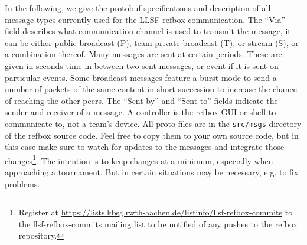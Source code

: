 \documentclass[a4paper]{article}
\begin{document}
In the following, we give the protobuf specifications and description
of all message types currently used for the LLSF refbox
communication. The ``Via'' field describes what communication channel
is used to transmit the message, it can be either public broadcast
(P), team-private broadcast (T), or stream (S), or a combination
thereof. Many messages are sent at certain periods. These are given in
seconds time in between two sent messages, or event if it is sent on
particular events. Some broadcast messages feature a burst mode to
send a number of packets of the same content in short succession to
increase the chance of reaching the other peers. The ``Sent by'' and
``Sent to'' fields indicate the sender and receiver of a message. A
controller is the refbox GUI or shell to communicate to, not a team's
device. All proto files are in the \texttt{src/msgs} directory of the
refbox source code. Feel free to copy them to your own source code,
but in this case make sure to watch for updates to the messages and
integrate those changes\footnote{Register at
  \url{https://lists.kbsg.rwth-aachen.de/listinfo/llsf-refbox-commits}
  to the llsf-refbox-commits mailing list to be notified of any pushes
  to the refbox repository.}. The intention is to keep changes at a
minimum, especially when approaching a tournament. But in certain
situations may be necessary, e.g. to fix problems.

\bigskip

\newcommand{\msgspec}[6]{%
\hspace{-1.1\parindent}
\begin{minipage}{\linewidth}
  \begin{minipage}[t]{.56\linewidth}
    \vspace{0pt}
    
      {../../src/msgs/#1}
  \end{minipage}
  \hspace{.01\linewidth}
  \begin{minipage}[t]{.43\linewidth}
    \vspace{2pt}
    \small
    \begin{tabular}{>{\bfseries}ll>{\bfseries}ll}
      File:&\multicolumn{3}{p{.95\linewidth}}{%
        \texttt{#1}
      }\\[3pt]
      Groups:&#2&Period:&#3\\
      Sent by:&#4&Sent to:&#5\\[3pt]
      \multicolumn{4}{p{.95\linewidth}}{%
        #6
      }
    \end{tabular}
  \end{minipage}
\end{minipage}
}
\end{document}
